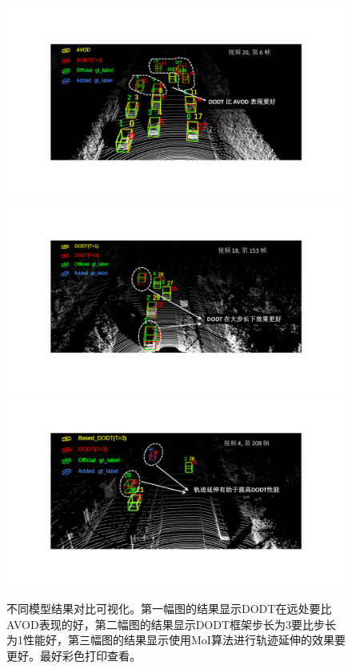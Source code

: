 \begin{figure}[!t]
	\centering
	\includegraphics[trim={4cm, 4cm, 5cm, 3.7cm}, clip, width=\textwidth]{./imgs/result_compare_01.pdf}
	\includegraphics[trim={4cm, 4cm, 5cm, 3.7cm}, clip, width=\textwidth]{./imgs/result_compare_02.pdf}
	\includegraphics[trim={4cm, 4cm, 5cm, 3.5cm}, clip, width=\textwidth]{./imgs/result_compare_03.pdf}
	\caption{不同模型结果对比可视化。第一幅图的结果显示DODT在远处要比AVOD表现的好，第二幅图的结果显示DODT框架步长为3要比步长为1性能好，第三幅图的结果显示使用MoI算法进行轨迹延伸的效果要更好。最好彩色打印查看。}
	\label{fig:result_compare}
\end{figure}
